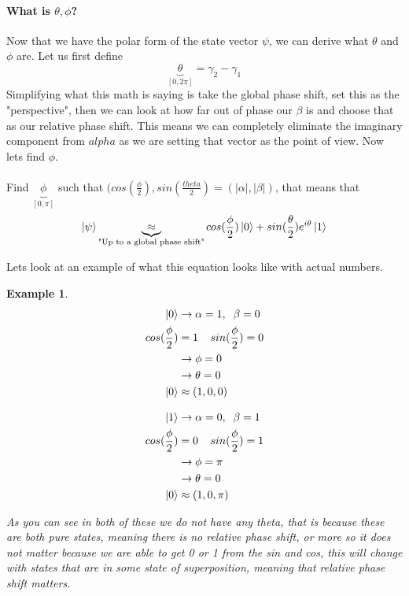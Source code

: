 \documentclass[12pt]{article}
\theoremstyle{plain}
\theoremstyle{nonumberplain}
\theoremstyle{plain}
\newtheorem{example}[lemma]{Example}
\theoremstyle{nonumberplain}
\newcommand\1{{\bf 1}}
\newcommand{\<}{\left\langle}
\renewcommand{\>}{\right\rangle}
\begin{document}
\paragraph{What is $\theta, \phi$?} 
Now that we have the polar form of the state vector $\psi$, we can derive what $\theta$ and $\phi$ are.  Let us first define 
\begin{equation}
\underbrace{\theta}_{[0,2\pi]} = \gamma_2 - \gamma_1
\end{equation} 
Simplifying what this math is saying is take the global phase shift, set this as the "perspective", then we can look at how far out of phase our $\beta$ is and choose that as our relative phase shift.  This means we can completely eliminate the imaginary component from $alpha$ as we are setting that vector as the point of view.  Now lets find $\phi$.\\
\\
Find $\underbrace{\phi}_{[0,\pi]}$ such that $(cos(\frac{\phi}{2}), sin(\frac{theta}{2}) = (|\alpha|, |\beta|)$, that means that 
\begin{equation}
\ket{\psi} \underbrace{\approx}_{\text{"Up to a global phase shift"}} cos(\frac{\phi}{2})\ket{0} + sin(\frac{\theta}{2}) e^{i\theta} \ket{1}
\end{equation}

Lets look at an example of what this equation looks like with actual numbers.
\begin{example}
\begin{equation}
\begin{split}
\ket{0} &\rightarrow \alpha = 1, \;\; \beta = 0\\
cos(\frac{\phi}{2}) &= 1 \;\;\;\; sin(\frac{\phi}{2}) = 0\\
&\rightarrow \phi = 0\\
&\rightarrow \theta = 0\\
\ket{0} &\approx (1,0,0)
\end{split}
\end{equation}

\begin{equation}
\begin{split}
\ket{1} &\rightarrow \alpha = 0, \;\; \beta = 1\\
cos(\frac{\phi}{2}) &= 0 \;\;\;\; sin(\frac{\phi}{2}) = 1\\
&\rightarrow \phi = \pi\\
&\rightarrow \theta = 0\\
\ket{0} &\approx (1,0,\pi)
\end{split}
\end{equation}

As you can see in both of these we do not have any theta, that is because these are both pure states, meaning there is no relative phase shift, or more so it does not matter because we are able to get 0 or 1 from the sin and cos, this will change with states that are in some state of superposition, meaning that relative phase shift matters.
\end{example}
\end{document}
